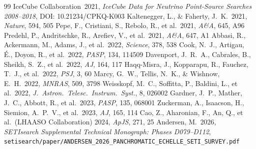 \documentclass[twocolumn,10pt]{article}
\begin{document}
\begin{thebibliography}{99}
 IceCube Collaboration\ 2021, \textit{IceCube Data for Neutrino Point-Source Searches 2008--2018}, DOI: 10.21234/CPKQ-K003
 Kaltenegger, L., \& Faherty, J.~K.\ 2021, \textit{Nature}, 594, 505
 Pepe, F., Cristiani, S., Rebolo, R., et al.\ 2021, \textit{A\&A}, 645, A96
 Predehl, P., Andritschke, R., Arefiev, V., et al.\ 2021, \textit{A\&A}, 647, A1
 Abbasi, R., Ackermann, M., Adams, J., et al.\ 2022, \textit{Science}, 378, 538
 Cook, N.~J., Artigau, \'{E}., Doyon, R., et al.\ 2022, \textit{PASP}, 134, 114509
 Davenport, J.~R.~A., Cabrales, B., Sheikh, S.~Z., et al.\ 2022, \textit{AJ}, 164, 117
 Haqq-Misra, J., Kopparapu, R., Fauchez, T.~J., et al.\ 2022, \textit{PSJ}, 3, 60
 Marcy, G.~W., Tellis, N.~K., \& Wishnow, E.~H.\ 2022, \textit{MNRAS}, 509, 3798
 Weisskopf, M.~C., Soffitta, P., Baldini, L., et al.\ 2022, \textit{J.\ Astron.\ Telesc.\ Instrum.\ Syst.}, 8, 026002
 Gardner, J.~P., Mather, J.~C., Abbott, R., et al.\ 2023, \textit{PASP}, 135, 068001
 Zuckerman, A., Isaacson, H., Siemion, A.~P.~V., et al.\ 2023, \textit{AJ}, 165, 114
 Cao, Z., Aharonian, F., An, Q., et al.\ (LHAASO Collaboration) 2024, \textit{ApJS}, 271, 25
 Andersen, M.\ 2026, \textit{SETIsearch Supplemental Technical Monograph: Phases D079--D112}, \texttt{setisearch/\allowbreak paper/\allowbreak ANDERSEN\_2026\_\allowbreak PANCHROMATIC\_\allowbreak ECHELLE\_\allowbreak SETI\_SURVEY.pdf}
\end{thebibliography}
\end{document}
